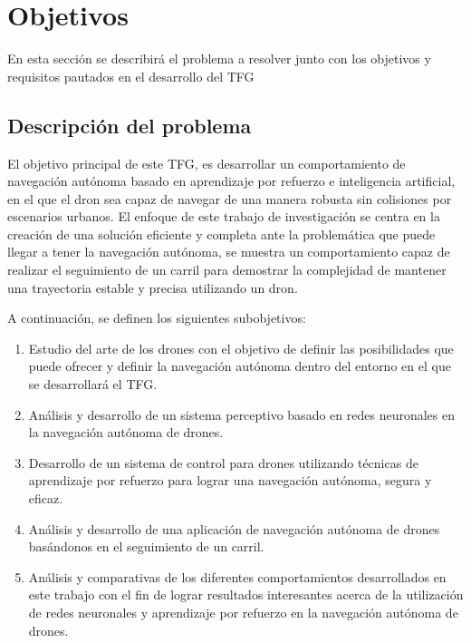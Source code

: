 \chapter{Objetivos}
\label{cap:capitulo2}


En esta sección se describirá el problema a resolver junto con los objetivos y requisitos pautados en el desarrollo del TFG


\section{Descripción del problema}
\label{sec:descripcion}

El objetivo principal de este TFG, es desarrollar un comportamiento de navegación autónoma basado en 
aprendizaje por refuerzo e inteligencia artificial, en el que el dron sea capaz de navegar de una manera robusta sin colisiones por escenarios urbanos. El enfoque de este trabajo de investigación 
se centra en la creación de una solución eficiente y completa ante la problemática que puede llegar a tener la navegación autónoma, se 
muestra un comportamiento capaz de realizar el seguimiento de un carril para demostrar la complejidad de mantener una trayectoria estable 
y precisa utilizando un dron. 

A continuación, se definen los siguientes subobjetivos: 

\begin{enumerate}
    \item Estudio del arte de los drones con el objetivo de definir las posibilidades que puede ofrecer y definir 
    la navegación autónoma dentro del entorno en el que se desarrollará el TFG. 
    \item Análisis y desarrollo de un sistema perceptivo basado en redes neuronales en la navegación autónoma de drones.
    \item Desarrollo  de un sistema de control para drones utilizando técnicas de aprendizaje por refuerzo para lograr una navegación 
    autónoma, segura y eficaz.
    \item Análisis y desarrollo de una aplicación de navegación autónoma de drones basándonos en el seguimiento de un carril.
    \item Análisis y comparativas de los diferentes comportamientos desarrollados en este trabajo con el fin de 
    lograr resultados interesantes acerca de la utilización de redes neuronales y aprendizaje por refuerzo en la navegación autónoma de drones.
\end{enumerate}
\newpage

